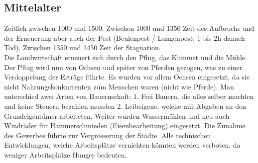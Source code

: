 \documentclass[10pt, openright=true]{scrartcl}
\begin{document}
\subsection{Mittelalter}
Zeitlich zwischen 1000 und 1500. Zwischen 1000 und 1350 Zeit des Aufbruchs und der Erneuerung aber auch der Pest (Beulenpest / Lungenpest: 1 bis 2h danach Tod). Zwischen 1350 und 1450 Zeit der Stagnation.\\ Die Landwirtschaft erneuert sich durch den Pflug, das Kummet und die Mühle. Der Pflug wird nun von Ochsen und später von Pferden gezogen, was zu einer Verdoppelung der Erträge führte. Es wurden vor allem Ochsen eingesetzt, da sie nicht Nahrungskonkurrenten zum Menschen waren (nicht wie Pferde). Man unterschied zwei Arten von Bauernschaft: 1. Frei Bauern, die alles selber machten und keine Steuern bezahlen mussten 2. Leibeigene, welche mit Abgaben an den Grundeigentümer arbeiteten. Weiter wurden Wassermühlen und neu auch Windräder für Hammerschmieden (Eisenbearbeitung) eingesetzt. Die Zunahme des Gewerbes führte zur Vergrösserung der Städte. Alle technischen Entwicklungen, welche Arbeitsplätze vernichten könnten werden verboten, da weniger Arbeitsplätze Hunger bedeuten.
\end{document}
